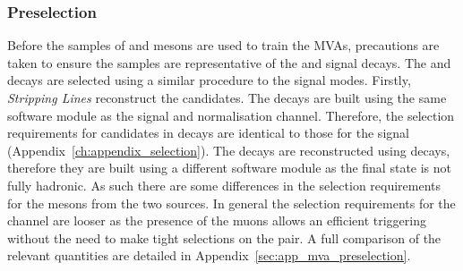 \subsubsection{Preselection}

Before the samples of \Dsp and \phiz mesons are used to train the MVAs, precautions are taken to ensure the samples are representative of the \decay{\Bp}{\Dsp\phiz} and \decay{\Bp}{\Dsp\Kp\Km} signal decays. The \decay{\Bsb}{\Dsp\pim} and \decay{\Bs}{\jpsi\phiz} decays are selected using a similar procedure to the signal modes. Firstly, \emph{Stripping Lines} reconstruct the candidates. The \decay{\Bsb}{\Dsp\pim} decays are built using the same software module as the signal and normalisation channel. Therefore, the selection requirements for \Dsp candidates in \decay{\Bsb}{\Dsp\pim} decays are identical to those for the signal (Appendix~\ref{ch:appendix_selection}).
The \decay{\Bs}{\jpsi\phiz} decays are reconstructed using \decay{\jpsi}{\mup\mun} decays, therefore they are built using a different software module as the final state is not fully hadronic. As such there are some differences in the selection requirements for the \phiz mesons from the two sources. In general the selection requirements for the \decay{\Bs}{\jpsi\phiz} channel are looser as the presence of the muons allows an efficient triggering without the need to make tight selections on the \Kp\Km pair. 
A full comparison of the relevant quantities are detailed in Appendix~\ref{sec:app_mva_preselection}.



